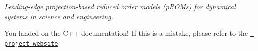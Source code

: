 \label{index_md_pages_main}%
%
 {\itshape Leading-\/edge projection-\/based reduced order models (p\+R\+O\+Ms) for dynamical systems in science and engineering.}

You landed on the C++ documentation! If this is a mistake, please refer to the \href{https://pressio.github.io/}{\texttt{ project website}} ~\newline
 